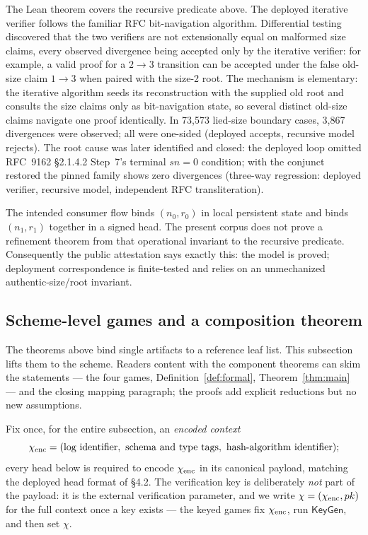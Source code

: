 \documentclass[11pt]{article}
\theoremstyle{remark}
\begin{document}
The Lean theorem covers the recursive predicate above. The deployed iterative
verifier follows the familiar RFC bit-navigation algorithm. Differential
testing discovered that the two verifiers are not extensionally equal on
malformed size claims, every observed divergence being accepted only by the
iterative verifier: for example, a valid proof for a $2\to3$ transition can
be accepted under the false old-size claim $1\to3$ when paired with the size-2
root. The mechanism is elementary: the iterative algorithm seeds its
reconstruction with the supplied old root and consults the size claims only as
bit-navigation state, so several distinct old-size claims navigate one proof
identically. In 73,573 lied-size boundary cases, 3,867 divergences were
observed; all were one-sided (deployed accepts, recursive model rejects).
The root cause was later identified and closed: the deployed loop omitted
RFC~9162 \S2.1.4.2 Step~7's terminal $sn=0$ condition; with the conjunct
restored the pinned family shows zero divergences (three-way regression:
deployed verifier, recursive model, independent RFC transliteration).

The intended consumer flow binds $(n_0,r_0)$ in local persistent state and
binds $(n_1,r_1)$ together in a signed head. The present corpus does not prove
a refinement theorem from that operational invariant to the recursive
predicate. Consequently the public attestation says exactly this: the model is
proved; deployment correspondence is finite-tested and relies on an
unmechanized authentic-size/root invariant.

\subsection{Scheme-level games and a composition theorem}\label{sec:games}

The theorems above bind single artifacts to a reference leaf list. This
subsection lifts them to the scheme. Readers content with the component
theorems can skim the statements --- the four games,
Definition~\ref{def:formal}, Theorem~\ref{thm:main} --- and the closing
mapping paragraph; the proofs add explicit reductions but no new assumptions.

Fix once, for the entire subsection, an \emph{encoded context}
\[\chi_{\rm enc}=(\text{log identifier},\ \text{schema and type tags},\
\text{hash-algorithm identifier});\]
every head below is required to encode $\chi_{\rm enc}$ in its canonical
payload, matching the deployed head format of \S4.2. The verification key is
deliberately \emph{not} part of the payload: it is the external verification
parameter, and we write $\chi=(\chi_{\rm enc},pk)$ for the full context once
a key exists --- the keyed games fix $\chi_{\rm enc}$, run
$\mathsf{KeyGen}$, and then set $\chi$.
\end{document}
